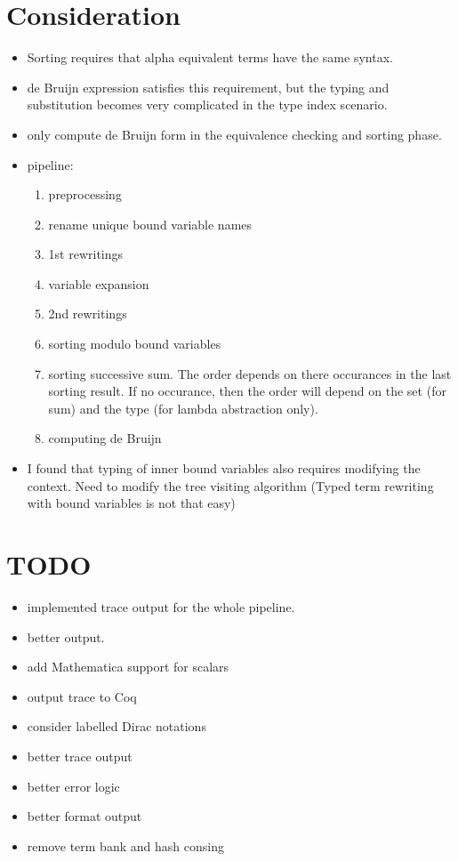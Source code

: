 \documentclass[runningheads]{llncs}
\begin{document}
\section{Consideration}
\begin{itemize}
    \item Sorting requires that alpha equivalent terms have the same syntax.
    \item de Bruijn expression satisfies this requirement, but the typing and substitution becomes very complicated in the type index scenario.
    \item only compute de Bruijn form in the equivalence checking and sorting phase.
    \item pipeline: 
        \begin{enumerate}
            \item preprocessing
            \item rename unique bound variable names
            \item 1st rewritings
            \item variable expansion
            \item 2nd rewritings 
            \item sorting modulo bound variables
            \item sorting successive sum. The order depends on there occurances in the last sorting result. If no occurance, then the order will depend on the set (for sum) and the type (for lambda abstraction only).
            \item computing de Bruijn
        \end{enumerate}

    \item I found that typing of inner bound variables also requires modifying the context.
    Need to modify the tree visiting algorithm
    (Typed term rewriting with bound variables is not that easy)    
\end{itemize}

\section{TODO}
\begin{itemize}
    \item implemented trace output for the whole pipeline.
    \item better output.
    \item add Mathematica support for scalars
    \item output trace to Coq
    \item consider labelled Dirac notations
    \item better trace output
    \item better error logic
    \item better format output
    \item remove term bank and hash consing
\end{itemize}
\end{document}
